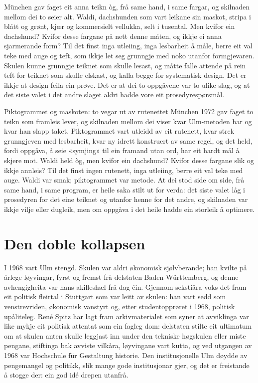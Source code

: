 München gav faget eit anna teikn òg, frå same hand, i same fargar, og skilnaden mellom dei to seier alt. Waldi, dachshunden som vart leikane sin maskot, stripa i blått og grønt, kjær og kommersielt vellukka, selt i tusental. Men kvifor ein dachshund? Kvifor desse fargane på nett denne måten, og ikkje ei anna sjarmerande form? Til det finst inga utleiing, inga lesbarheit å måle, berre eit val teke med auge og teft, som ikkje let seg grunngje med noko utanfor formgjevaren. Skulen kunne grunngje teiknet som skulle lesast, og måtte falle attende på rein teft for teiknet som skulle elskast, og kalla begge for systematisk design. Det er ikkje at design feila ein prøve. Det er at dei to oppgåvene var to ulike slag, og at det siste valet i det andre slaget aldri hadde vore eit prosedyrespørsmål.

\begin{kasus}{Piktogrammet og maskoten: to vegar ut av rutenettet}
München 1972 gav faget to teikn som framleis lever, og skilnaden mellom dei viser kvar Ulm-metoden bar og kvar han slapp taket. Piktogrammet vart utleidd av eit rutenett, kvar strek grunngjeven med lesbarheit, kvar ny idrett konstruert av same regel, og det held, fordi oppgåva, å seie «symjing» til ein framand utan ord, har eit hardt mål å skjere mot. Waldi held òg, men kvifor ein dachshund? Kvifor desse fargane slik og ikkje annleis? Til det finst ingen rutenett, inga utleiing, berre eit val teke med auge. Waldi var smak; piktogrammet var metode. At dei stod side om side, frå same hand, i same program, er heile saka stilt ut for verda: det siste valet låg i prosedyren for det eine teiknet og utanfor henne for det andre, og skilnaden var ikkje vilje eller dugleik, men om oppgåva i det heile hadde ein storleik å optimere.
\end{kasus}

\section{Den doble kollapsen}

I 1968 vart Ulm stengd. Skulen var aldri økonomisk sjølvberande; han kvilte på årlege løyvingar, fyrst og fremst frå delstaten Baden-Württemberg, og denne avhengigheita var hans akilleshæl frå dag éin. Gjennom sekstiåra voks det fram eit politisk fleirtal i Stuttgart som var leitt av skulen: han vart sedd som venstrevriden, økonomisk vanstyrt og, etter studentopprøret i 1968, politisk upåliteleg. René Spitz har lagt fram arkivmaterialet som syner at avviklinga var like mykje eit politisk attentat som ein fagleg dom: delstaten stilte eit ultimatum om at skulen anten skulle leggjast inn under den tekniske høgskulen eller miste pengane, stiftinga bak avviste vilkåra, løyvingane vart kutta, og ved utgangen av 1968 var Hochschule für Gestaltung historie\autocite{spitz2002ulm}. Den institusjonelle Ulm døydde av pengemangel og politikk, slik mange gode institusjonar gjer, og det er freistande å stogge der: ein god idé drepen utanfrå.

